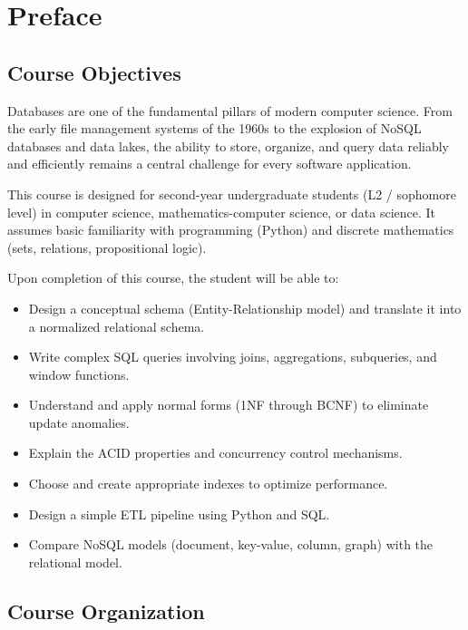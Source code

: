 \chapter*{Preface}

\section*{Course Objectives}

Databases are one of the fundamental pillars of modern computer science.
From the early file management systems of the 1960s to the explosion of
NoSQL databases and data lakes, the ability to store, organize, and query
data reliably and efficiently remains a central challenge for every
software application.

This course is designed for second-year undergraduate students (L2 / sophomore level)
in computer science, mathematics-computer science, or data science. It assumes
basic familiarity with programming (Python) and discrete mathematics (sets,
relations, propositional logic).

Upon completion of this course, the student will be able to:
\begin{itemize}
    \item Design a conceptual schema (Entity-Relationship model) and translate
          it into a normalized relational schema.
    \item Write complex SQL queries involving joins, aggregations, subqueries,
          and window functions.
    \item Understand and apply normal forms (1NF through BCNF) to eliminate
          update anomalies.
    \item Explain the ACID properties and concurrency control mechanisms.
    \item Choose and create appropriate indexes to optimize performance.
    \item Design a simple ETL pipeline using Python and SQL.
    \item Compare NoSQL models (document, key-value, column, graph)
          with the relational model.
\end{itemize}

\section*{Course Organization}

